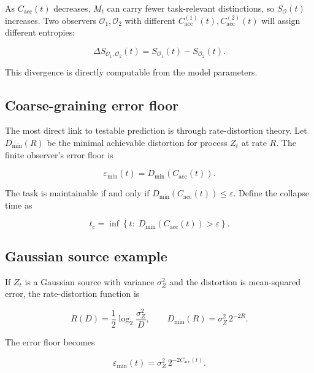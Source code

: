 \documentclass[10pt,a4paper,twocolumn,aps,prl]{revtex4-2}
\begin{document}
As $C_{\mathrm{acc}}(t)$ decreases, $M_t$ can carry fewer task-relevant distinctions, so $S_{\mathcal{O}}(t)$ increases. Two observers $\mathcal{O}_1,\mathcal{O}_2$ with different $C_{\mathrm{acc}}^{(1)}(t),C_{\mathrm{acc}}^{(2)}(t)$ will assign different entropies:

\begin{equation}
\Delta S_{\mathcal{O}_1,\mathcal{O}_2}(t)
=
S_{\mathcal{O}_1}(t)-S_{\mathcal{O}_2}(t).
\label{eq:entropy-divergence}
\end{equation}

This divergence is directly computable from the model parameters.

\subsection{Coarse-graining error floor}

The most direct link to testable prediction is through rate-distortion theory. Let $D_{\min}(R)$ be the minimal achievable distortion for process $Z_t$ at rate $R$. The finite observer's error floor is

\begin{equation}
\varepsilon_{\min}(t)
=
D_{\min}(C_{\mathrm{acc}}(t)).
\label{eq:error-floor}
\end{equation}

The task is maintainable if and only if $D_{\min}(C_{\mathrm{acc}}(t))\leq\varepsilon$. Define the collapse time as

\begin{equation}
t_c
=
\inf\left\{
t:\;
D_{\min}(C_{\mathrm{acc}}(t))>\varepsilon
\right\}.
\label{eq:collapse-time}
\end{equation}

\subsection{Gaussian source example}

If $Z_t$ is a Gaussian source with variance $\sigma_Z^2$ and the distortion is mean-squared error, the rate-distortion function is

\begin{equation}
R(D)
=
\frac{1}{2}\log_2\frac{\sigma_Z^2}{D},
\qquad
D_{\min}(R)
=
\sigma_Z^2\,2^{-2R}.
\label{eq:gaussian-rd}
\end{equation}

The error floor becomes

\begin{equation}
\boxed{
\varepsilon_{\min}(t)
=
\sigma_Z^2\,2^{-2C_{\mathrm{acc}}(t)}
}.
\label{eq:gaussian-floor}
\end{equation}
\end{document}
